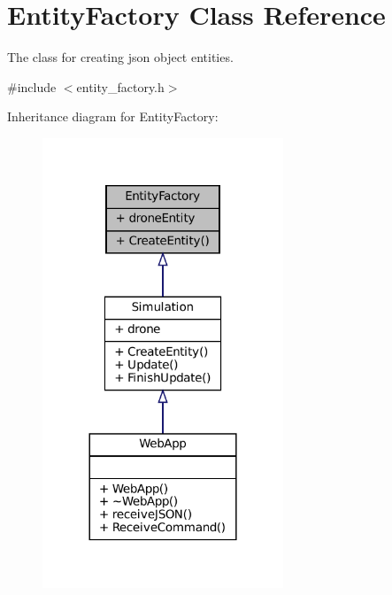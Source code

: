 \hypertarget{classEntityFactory}{}\section{Entity\+Factory Class Reference}
\label{classEntityFactory}


The class for creating json object entities.  




{\ttfamily \#include $<$entity\+\_\+factory.\+h$>$}



Inheritance diagram for Entity\+Factory\+:\nopagebreak
\begin{figure}[H]
\begin{center}
\leavevmode
\includegraphics[width=204pt]{classEntityFactory__inherit__graph}
\end{center}
\end{figure}


